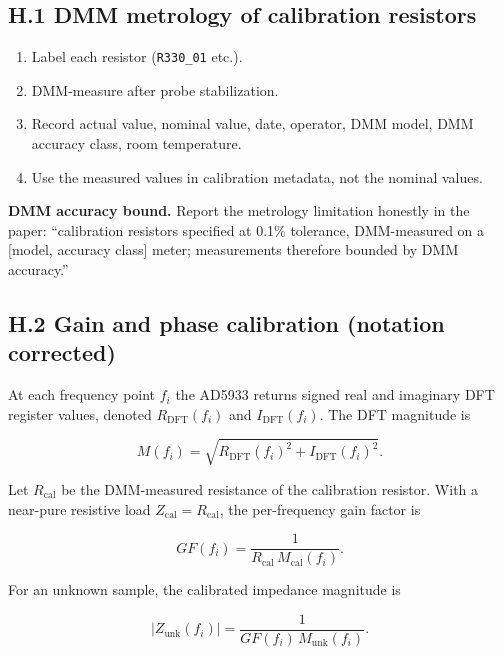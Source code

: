 \documentclass[11pt,a4paper]{article}
\begin{document}
\subsection{H.1 DMM metrology of calibration resistors}

\begin{enumerate}
\item Label each resistor (\texttt{R330\_01} etc.).
\item DMM-measure after probe stabilization.
\item Record actual value, nominal value, date, operator, DMM model, DMM accuracy class, room temperature.
\item Use the measured values in calibration metadata, not the nominal values.
\end{enumerate}

\begin{openbox}
\textbf{DMM accuracy bound.} Report the metrology limitation honestly in the paper: ``calibration resistors specified at 0.1\% tolerance, DMM-measured on a [model, accuracy class] meter; measurements therefore bounded by DMM accuracy.''
\end{openbox}

\subsection{H.2 Gain and phase calibration (notation corrected)}

At each frequency point $f_i$ the AD5933 returns signed real and imaginary DFT register values, denoted $R_{\mathrm{DFT}}(f_i)$ and $I_{\mathrm{DFT}}(f_i)$. The DFT magnitude is

\begin{equation}
M(f_i) = \sqrt{R_{\mathrm{DFT}}(f_i)^2 + I_{\mathrm{DFT}}(f_i)^2}.
\label{eq:dft_magnitude}
\end{equation}

Let $R_{\mathrm{cal}}$ be the DMM-measured resistance of the calibration resistor. With a near-pure resistive load $Z_{\mathrm{cal}} = R_{\mathrm{cal}}$, the per-frequency gain factor is

\begin{equation}
GF(f_i) = \frac{1}{R_{\mathrm{cal}}\, M_{\mathrm{cal}}(f_i)}.
\label{eq:gain_factor}
\end{equation}

For an unknown sample, the calibrated impedance magnitude is

\begin{equation}
|Z_{\mathrm{unk}}(f_i)| = \frac{1}{GF(f_i)\, M_{\mathrm{unk}}(f_i)}.
\label{eq:unknown_impedance}
\end{equation}
\end{document}
